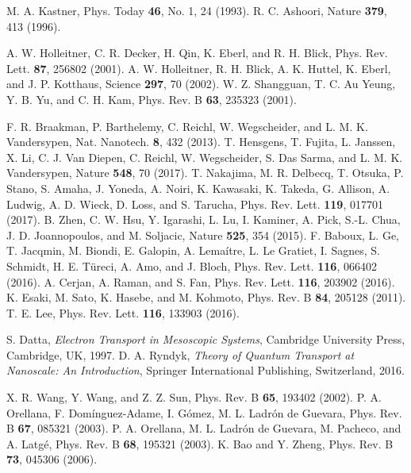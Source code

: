 \documentclass[twocolumn,showpacs,epsfig,pre]{revtex4}
\begin{document}
\begin{thebibliography}{150}

 M. A. Kastner, Phys. Today {\bf 46}, No. 1, 24 (1993).
 R. C. Ashoori, Nature {\bf 379}, 413 (1996).

 A. W. Holleitner, C. R. Decker, H. Qin, K. Eberl, and R. H. Blick, Phys. Rev. Lett. {\bf 87}, 256802 (2001).
 A. W. Holleitner, R. H. Blick, A. K. Huttel, K. Eberl, and J. P. Kotthaus, Science {\bf 297}, 70 (2002).
 W. Z. Shangguan, T. C. Au Yeung, Y. B. Yu, and C. H. Kam, Phys. Rev. B {\bf 63}, 235323 (2001).

 F. R. Braakman, P. Barthelemy, C. Reichl, W. Wegscheider, and L. M. K. Vandersypen, Nat. Nanotech. {\bf 8}, 432 (2013).
 T. Hensgens, T. Fujita, L. Janssen, X. Li, C. J. Van Diepen, C. Reichl, W. Wegscheider, S. Das Sarma, and L. M. K. Vandersypen, Nature {\bf 548}, 70 (2017).
 T. Nakajima, M. R. Delbecq, T. Otsuka, P. Stano, S. Amaha, J. Yoneda, A. Noiri, K. Kawasaki, K. Takeda, G. Allison, A. Ludwig, A. D. Wieck, D. Loss, and S. Tarucha, Phys. Rev. Lett. {\bf 119}, 017701 (2017).
 B. Zhen, C. W. Hsu, Y. Igarashi, L. Lu, I. Kaminer, A. Pick, S.-L. Chua, J. D. Joannopoulos, and M. Soljacic, Nature {\bf 525}, 354 (2015).
 F. Baboux, L. Ge, T. Jacqmin, M. Biondi, E. Galopin, A. Lema{\'i}tre, L. Le Gratiet, I. Sagnes, S. Schmidt, H. E. T{\"u}reci, A. Amo, and J. Bloch, Phys. Rev. Lett. {\bf 116}, 066402 (2016).
 A. Cerjan, A. Raman, and S. Fan, Phys. Rev. Lett. {\bf 116}, 203902 (2016).
 K. Esaki, M. Sato, K. Hasebe, and M. Kohmoto, Phys. Rev. B {\bf 84}, 205128 (2011).
 T. E. Lee, Phys. Rev. Lett. {\bf 116}, 133903 (2016).

 S. Datta, {\it Electron Transport in Mesoscopic Systems}, Cambridge University Press, Cambridge, UK, 1997.
 D. A. Ryndyk, {\it Theory of Quantum Transport at Nanoscale: An Introduction}, Springer International Publishing, Switzerland, 2016. 

 X. R. Wang, Y. Wang, and Z. Z. Sun, Phys. Rev. B {\bf 65}, 193402 (2002).
 P.  A. Orellana, F. Dom{\'i}nguez-Adame, I. G{\'o}mez, M. L. Ladr{\'o}n de Guevara, Phys. Rev. B {\bf 67}, 085321 (2003).
 P. A. Orellana, M. L. Ladr{\'o}n de Guevara, M. Pacheco, and A. Latg{\'e}, Phys. Rev. B {\bf 68}, 195321 (2003).
 K. Bao and Y. Zheng, Phys. Rev. B {\bf 73}, 045306 (2006).



\end{thebibliography}
\end{document}
